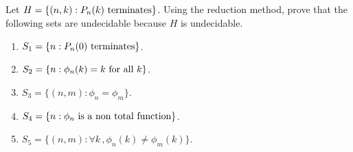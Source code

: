 \subsection{} %
Let \(H = \{(n, k): P_n(k) \textnormal{ terminates}\}\).
Using the reduction method, prove that the following sets are undecidable
because \(H\) is undecidable.
\begin{enumerate}
	\item \(S_1 = \{n : P_n(0) \textnormal{ terminates}\}\).
	\item \(S_2 = \{n : \phi_n(k) = k \textnormal{ for all } k\}\).
	\item \(S_3 = \{(n, m) : \phi_n = \phi_m\}\).
	\item \(S_4 = \{n : \phi_n \textnormal{ is a non total function}\}\).
	\item \(S_5 = \{(n, m) : \forall k\,, \phi_n(k) \ne \phi_m(k)\}\).
\end{enumerate}

